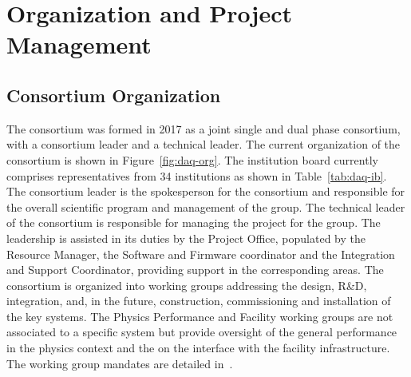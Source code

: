 \section{Organization and Project Management}
\label{sec:daq:organization}


\subsection{Consortium Organization}

The  consortium was formed in 2017 as a joint single and
dual phase consortium, with a consortium leader and a technical
leader. The current organization of the consortium is shown in
Figure~\ref{fig:daq-org}. The  institution board currently comprises
representatives from 34 institutions as shown in Table~\ref{tab:daq-ib}. The consortium leader is the spokesperson for the consortium and responsible for the overall scientific program and management of the group. The technical leader of the consortium is responsible for
managing the project for the group. The leadership is assisted in its duties by the Project Office, populated by the Resource Manager, the Software and Firmware coordinator and the Integration and Support Coordinator, providing support in the corresponding areas. 
The consortium is organized into working groups addressing the design,
R\&D, integration, and, in the future, construction, commissioning and installation of the key  systems. The Physics Performance and Facility working groups are not associated to a specific system but provide oversight of the general  performance in the physics context and the on the interface with the facility infrastructure. The  working group mandates are detailed in~.


